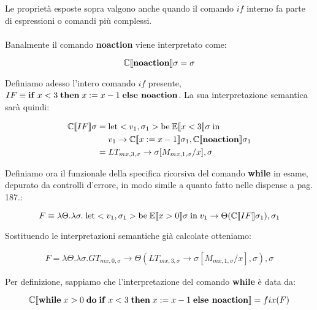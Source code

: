     Le proprietà esposte sopra valgono anche quando il comando $if$ interno fa parte di espressioni o comandi più complessi.\\
    \\
    Banalmente il comando \textbf{noaction} viene interpretato come:
    
    \begin{equation*}
        \mathbb{C}\llbracket \mbox{\textbf{noaction}} \rrbracket\sigma = \sigma
    \end{equation*}
    
    Definiamo adesso l'intero comando $if$ presente, $IF \equiv \mbox{\textbf{if}}\; x<3\; \mbox{\textbf{then}}\; x:=x-1\; \mbox{\textbf{else noaction}}$. La sua interpretazione semantica sarà quindi:
    
    \begin{align*}
        \mathbb{C}\llbracket IF \rrbracket\sigma =\;& \mbox{let} <v_1,\sigma_1> \mbox{be}\; \mathbb{E}\llbracket x<3 \rrbracket\sigma\; \mbox{in}\\
        & v_1\rightarrow\mathbb{C}\llbracket x:=x-1 \rrbracket\sigma_1,\mathbb{C}\llbracket \mbox{\textbf{noaction}} \rrbracket\sigma_1\\
        =\;& LT_{mx,3,\sigma}\rightarrow \sigma[M_{mx,1,\sigma}/x], \sigma
    \end{align*}
    
    Definiamo ora il funzionale della specifica ricorsiva del comando \textbf{while} in esame, depurato da controlli d'errore, in modo simile a quanto fatto nelle dispense a pag. 187.:
    
    \begin{equation*}
        F \equiv \lambda\Theta.\lambda\sigma.\; \mbox{let} <v_1,\sigma_1> \mbox{be}\; \mathbb{E}\llbracket x>0 \rrbracket\sigma\; \mbox{in}\; v_1 \rightarrow \Theta(\mathbb{C}\llbracket IF \rrbracket\sigma_1), \sigma_1
    \end{equation*}
    
    Sostituendo le interpretazioni semantiche già calcolate otteniamo:
    
    \begin{align*}
        F = \lambda\Theta.\lambda\sigma. GT_{mx,0,\sigma} \rightarrow \Theta(LT_{mx,3,\sigma}\rightarrow \sigma[M_{mx,1,\sigma}/x], \sigma), \sigma
    \end{align*}
    
    Per definizione, sappiamo che l'interpretazione del comando \textbf{while} è data da:
    
    \begin{equation*}
        \mathbb{C}\llbracket \mbox{\textbf{while}}\; x>0\; \mbox{\textbf{do}}\; \mbox{\textbf{if}}\; x<3\; \mbox{\textbf{then}}\; x:=x-1\; \mbox{\textbf{else noaction}} \rrbracket = fix(F)
    \end{equation*}
    
